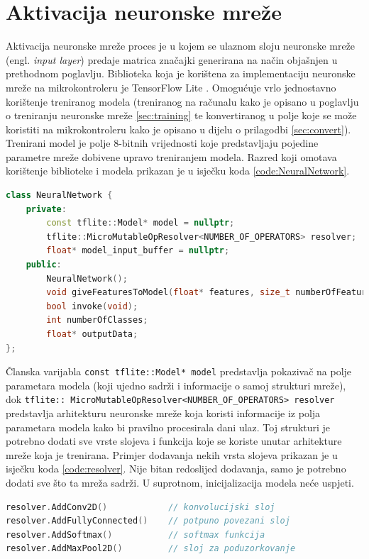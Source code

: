 \section{Aktivacija neuronske mreže}
\label{sec:activation}

Aktivacija neuronske mreže proces je u kojem se ulaznom sloju neuronske mreže 
(engl. \textit{input layer}) predaje matrica značajki generirana na način objašnjen u prethodnom
poglavlju. Biblioteka koja je korištena za implementaciju
neuronske mreže na mikrokontroleru je TensorFlow Lite \cite{tflm}. Omogućuje vrlo jednostavno
korištenje treniranog modela (treniranog na računalu kako je opisano u poglavlju
o treniranju neuronske mreže \ref{sec:training} te konvertiranog
u polje koje se može koristiti na mikrokontroleru kako je opisano u dijelu
o prilagodbi \ref{sec:convert}). Trenirani model
je polje 8-bitnih vrijednosti koje predstavljaju pojedine parametre mreže dobivene upravo 
treniranjem modela. Razred koji omotava korištenje biblioteke i modela prikazan je 
u isječku koda \ref{code:NeuralNetwork}. 
\newpage

\begin{lstlisting}[language=C++, caption=Razred neuronske mreže, label=code:NeuralNetwork]
class NeuralNetwork {
    private:
        const tflite::Model* model = nullptr;
        tflite::MicroMutableOpResolver<NUMBER_OF_OPERATORS> resolver;
        float* model_input_buffer = nullptr;
    public:
        NeuralNetwork();
        void giveFeaturesToModel(float* features, size_t numberOfFeatures);
        bool invoke(void);
        int numberOfClasses;
        float* outputData;  
};   
\end{lstlisting}

Članska varijabla \texttt{const tflite::Model* model} predstavlja 
pokazivač na polje parametara modela (koji ujedno sadrži i informacije o samoj strukturi mreže),
dok \texttt{tflite:: MicroMutableOpResolver<NUMBER\_OF\_OPERATORS> resolver}
predstavlja arhitekturu neuronske mreže koja koristi informacije iz polja parametara
modela kako bi pravilno procesirala dani ulaz. Toj strukturi je potrebno dodati sve vrste slojeva 
i funkcija koje se koriste unutar arhitekture mreže koja je trenirana. Primjer dodavanja 
nekih vrsta slojeva prikazan je u isječku koda \ref{code:resolver}. Nije bitan redoslijed 
dodavanja, samo je potrebno dodati sve što ta mreža sadrži. U suprotnom, inicijalizacija
modela neće uspjeti.

\begin{lstlisting}[language=C++, caption=Gradnja arhitekture mreže, label=code:resolver]
resolver.AddConv2D()            // konvolucijski sloj
resolver.AddFullyConnected()    // potpuno povezani sloj
resolver.AddSoftmax()           // softmax funkcija
resolver.AddMaxPool2D()         // sloj za poduzorkovanje
\end{lstlisting}

